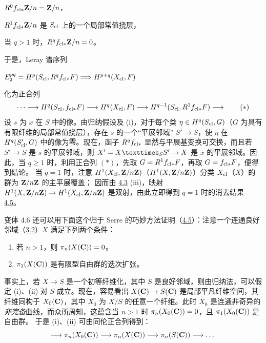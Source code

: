 $R^0f_{\cl\!\ast}\ZZ/\sisi{n\ZZ}{n}=\ZZ/\sisi{n\ZZ}{n}$，

$R^1f_{\cl\!\ast}\ZZ/\sisi{n\ZZ}{n}$ 是 $S_{\cl}$ 上的一个局部常值挠层，

当 $q>1$ 时，$R^qf_{\cl\!\ast}\ZZ/\sisi{n\ZZ}{n}=0$。

于是，Leray 谱序列

$E^{pq}_2=H^p(S_{\cl}, R^qf_{\cl\!\ast}F)\Longrightarrow
H^{p+q}(X_{\cl},F)$

\noindent
化为正合列
\begin{equation*}
\ldots\longrightarrow H^q(S_{\cl},f_{\cl\!\ast}F)\longrightarrow
H^q(X_{\cl},F)\longrightarrow H^{q-1}(S_{\cl},
R^1f_{\cl\!\ast}F)\longrightarrow\tag{$\ast$}
\end{equation*}
设 $s$ 为 $x$ 在 $S$ 中的像。由归纳假设及 (i)，对于每个类 $\eta\in H^q(S_{\cl},G)$（$G$ 为具有有限纤维的局部常值挠层），存在 $s$ 的一个“平展邻域” $S'\rightarrow S$，使 $\eta$ 在 $H^q(S'_{\cl},G)$ 中的像为零。现在，函子 $R^qf_{\cl\!\ast}$ 显然与平展基变换可交换，而且若 $S'\rightarrow S$ 是 $s$ 的平展邻域，则 $X'=\fprod{X}{S'}{S}\rightarrow X$ 是 $x$ 的平展邻域。因此，当 $q\geq 1$ 时，利用正合列 $(\ast)$，先取 $G=R^1f_{\cl\!\ast}F$，再\pageoriginale 取 $G=f_{\cl\!\ast}F$，便得到结论。 %
当 $q=1$ 时，注意 $H^1(X_{\cl},\ZZ/n \ZZ)$（\resp $H^1(X,\ZZ/n\ZZ)$）分类 $X_{\cl}$（\resp $X$）的群为 $\ZZ/n\ZZ$ 的主平展覆盖；
因而由 \hyperref[XI.thm4.3]{4.3} (iii)，映射 $H^1(X,\ZZ/n\ZZ)\rightarrow H^1(X_{\cl},\ZZ/n\ZZ)$ 是双射，由此立即得到 $q=1$ 时的消去结果 \hyperref[XI.lem4.5]{4.5}。

\begin{enonce*}[remark]{变体 4.6}
还可以用下面这个归于 Serre 的巧妙方法证明（\hyperref[XI.lem4.5]{4.5}）：注意一个连通良好邻域（\hyperref[XI.def3.2]{3.2}）$X$ 满足下列两个条件：
\begin{enumerate}
\renewcommand{\theenumi}{\roman{enumi}}
\renewcommand{\labelenumi}{(\theenumi)}
\item 若 $n>1$，则 $\pi_n(X(\CC))=0$。

\item $\pi_1(X(\CC))$ 是有限型自由群的迭次扩张。
\end{enumerate}
\end{enonce*}

事实上，若 $X\rightarrow S$ 是一个初等纤维化，其中 $S$ 是良好邻域，则由归纳法，可以假定 (i)、(ii) 对 $S$ 成立。现在，容易看出 $X(\CC)\rightarrow S(\CC)$ 是局部平凡纤维空间，其纤维同构于 $X_0(\CC)$，其中 $X_0$ 为 $X/S$ 的任意一个纤维。此时 $X_0$ 是连通非奇异的\emph{非完备}曲线，而众所周知，这蕴含当 $n>1$ 时 $\pi_n(X_0(\CC))=0$，且 $\pi_1(X_0(\CC))$ 是自由群。 %
于是 (i)、(ii) 可由同伦正合列得到：
$$
\longrightarrow \pi_n(X_0(\CC))\longrightarrow
\pi_n (X(\CC))\longrightarrow \pi_n
(S(\CC))\longrightarrow\ldots
$$


